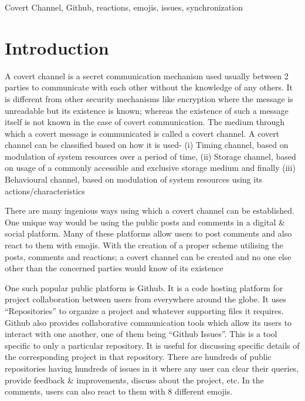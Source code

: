 \documentclass[conference]{IEEEtran}
\begin{document}
\begin{IEEEkeywords}
Covert Channel, Github, reactions, emojis, issues, synchronization

\end{IEEEkeywords}

\section{Introduction}
A covert channel is a secret communication mechanism used usually between 2 parties to communicate with each other without the knowledge of any others. It is different from other security mechanisms like encryption where the message is unreadable but its existence is known; whereas the existence of such a message itself is not known in the case of covert communication. The medium through which a covert message is communicated is called a covert channel. A covert channel can be classified based on how it is used- (i) Timing channel, based on modulation of system resources over a period of time, (ii) Storage channel, based on usage of a commonly accessible and exclusive storage medium and finally (iii) Behavioural channel, based on modulation of system resources using its actions/characteristics

There are many ingenious ways using which a covert channel can be established. One unique way would be using the public posts and comments in a digital \& social platform. Many of these platforms allow users to post comments and also react to them with emojis. With the creation of a proper scheme utilising the posts, comments and reactions; a covert channel can be created and no one else other than the concerned parties would know of its existence

One such popular public platform is Github. It is a code hosting platform for project collaboration between users from everywhere around the globe. It uses “Repositories” to organize a project and whatever supporting files it requires. Github also provides collaborative communication tools which allow its users to interact with one another, one of them being “Github Issues”. This is a tool specific to only a particular repository. It is useful for discussing specific details of the corresponding project in that repository. There are hundreds of public repositories having hundreds of issues in it where any user can clear their queries, provide feedback \& improvements, discuss about the project, etc. In the comments, users can also react to them with 8 different emojis.
\end{document}
